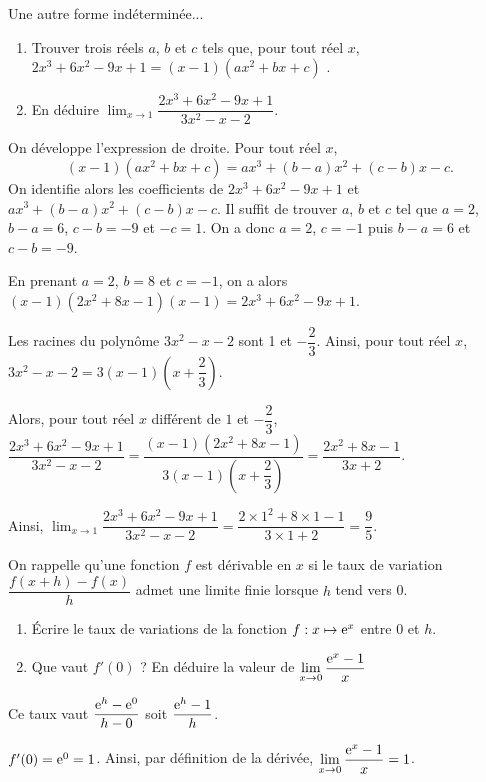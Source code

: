 \documentclass[11pt,fleqn, openany]{book} %
\begin{document}
\begin{exercise} Une autre forme indéterminée...
\begin{enumerate}
\item Trouver trois réels $a$, $b$ et $c$ tels que, pour tout réel $x$, \(2x^3+6x^2-9x+1=(x-1)(ax^2+bx+c)\)	.
\item En déduire $\displaystyle \lim_{x \to 1} \dfrac{2x^3+6x^2-9x+1}{3x^2-x-2}$.
\end{enumerate}\end{exercise}

\begin{solution}On développe l'expression de droite. Pour tout réel $x$,
\[(x-1)(ax^2+bx+c) = ax^3+(b-a)x^2+(c-b)x-c.\]
On identifie alors les coefficients de $2x^3+6x^2-9x+1$ et $ax^3+(b-a)x^2+(c-b)x-c$. Il suffit de trouver $a$, $b$ et $c$ tel que $a=2$, $b-a=6$, $c-b=-9$ et $-c=1$. On a donc $a=2$, $c=-1$ puis $b-a=6$ et $c-b=-9$.

En prenant $a=2$, $b=8$ et $c=-1$, on a alors $(x-1)(2x^2+8x-1)(x-1)=2x^3+6x^2-9x+1$.

Les racines du polynôme $3x^2-x-2$ sont 1 et $-\dfrac{2}{3}$. Ainsi, pour tout réel $x$, $3x^2-x-2=3(x-1)\left(x+\dfrac{2}{3}\right)$. 

Alors, pour tout réel $x$ différent de $1$ et $-\dfrac{2}{3}$, $\dfrac{2x^3+6x^2-9x+1}{3x^2-x-2}=\dfrac{(x-1)(2x^2+8x-1)}{3(x-1)\left(x+\dfrac{2}{3}\right)}=\dfrac{2x^2+8x-1}{3x+2}$.

Ainsi, $\displaystyle \lim_{x \to 1} \dfrac{2x^3+6x^2-9x+1}{3x^2-x-2}=\dfrac{2\times 1^2+8\times 1 -1}{3 \times 1 +2 }=\dfrac{9}{5}$.\end{solution}





\begin{exercise}

On rappelle qu'une fonction $f$ est dérivable en $x$ si le taux de variation $\dfrac{f(x+h)-f(x)}{h}$ admet une limite finie lorsque $h$ tend vers 0.

\begin{enumerate}
\item Écrire le taux de variations de la fonction $f:x\mapsto \mathrm{e}^x$ entre 0 et $h$.
\item Que vaut $f'(0)$ ? En déduire la valeur de $\displaystyle \lim_{x \to 0} \dfrac{\mathrm{e}^x-1}{x}$
\end{enumerate}\end{exercise}

\begin{solution}Ce taux vaut $\dfrac{\mathrm{e}^h-\mathrm{e}^0}{h-0}$ soit $\dfrac{\mathrm{e}^h-1}{h}$.

$f'(0)=\mathrm{e}^0=1$. Ainsi, par définition de la dérivée, $\displaystyle \lim_{x \to 0} \dfrac{\mathrm{e}^x-1}{x} = 1$.\end{solution}
\end{document}
